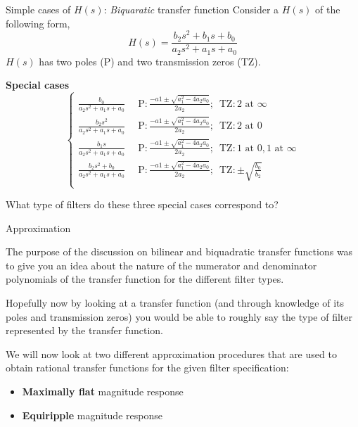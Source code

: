\documentclass{beamer}
\begin{document}
\begin{frame}{Simple cases of $H(s)$: \textit{Biquaratic} transfer function}
Consider a $H(s)$ of the following form,
\[ H(s) = \frac{b_2s^2 + b_1s + b_0}{a_2s^2 + a_1s + a_0} \]
$H(s)$ has two poles (P) and two transmission zeros (TZ).
\vspace{2mm}

\textbf{Special cases}
\[\begin{cases}
\frac{b_0}{a_2s^2+a_1s+a_0} & \,\,\,\text{P}: \frac{-a1\pm \sqrt{a_1^2 - 4a_2a_0}}{2a_2};\,\,\,\text{TZ}: \text{2 at } \infty \\
\frac{b_2s^2}{a_2s^2+a_1s+a_0} & \,\,\,\text{P}: \frac{-a1\pm \sqrt{a_1^2 - 4a_2a_0}}{2a_2}; \,\,\,\text{TZ}: \text{2 at } 0 \\
\frac{b_1s}{a_2s^2+a_1s+a_0} & \,\,\,\text{P}: \frac{-a1\pm \sqrt{a_1^2 - 4a_2a_0}}{2a_2}; \,\,\,\text{TZ}: \text{1 at } 0, \text{1 at } \infty \\
\frac{b_2s^2+b_0}{a_2s^2+a_1s+a_0} & \,\,\,\text{P}: \frac{-a1\pm \sqrt{a_1^2 - 4a_2a_0}}{2a_2}; \,\,\,\text{TZ}: \pm \sqrt{\frac{b_0}{b_2}} \\
\end{cases}
\]

What type of filters do these three special cases correspond to?
\end{frame}

\begin{frame}{Approximation}

The purpose of the discussion on  bilinear and biquadratic transfer functions was to give you an idea about the nature of the numerator and denominator polynomials of the transfer function for the different filter types.\\
\vspace{2mm}

Hopefully now by looking at a transfer function (and through knowledge of its poles and transmission zeros) you would be able to roughly say the type of filter represented by the transfer function.\\
\vspace{2mm}

We will now look at two different approximation procedures that are used to obtain rational transfer functions for the given filter specification:
\begin{itemize}
\item \textbf{Maximally flat} magnitude response
\item \textbf{Equiripple} magnitude response
\end{itemize}
\end{frame}
\end{document}
